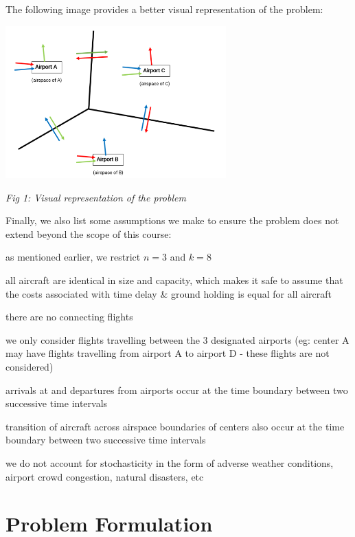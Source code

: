 \documentclass[conference]{IEEEtran}
\begin{document}
The following image provides a better visual representation of the problem:
\begin{center}
    \centerline{\includegraphics[width=8.5cm]{problem_description.png}}
    \textit{Fig 1: Visual representation of the problem}
\end{center}

Finally, we also list some assumptions we make to ensure the problem does not extend beyond the scope of this course:
\begin{enumerate}[label={[\arabic*]}]
    \item as mentioned earlier, we restrict $n=3$ and $k=8$
    \item all aircraft are identical in size and capacity, which makes it safe to assume that the costs associated with time delay \& ground holding is equal for all aircraft
    \item there are no connecting flights
    \item we only consider flights travelling between the 3 designated airports (eg: center A may have flights travelling from airport A to airport D - these flights are not considered)
    \item arrivals at and departures from airports occur at the time boundary between two successive time intervals
    \item transition of aircraft across airspace boundaries of centers also occur at the time boundary between two successive time intervals
    \item we do not account for stochasticity in the form of adverse weather conditions, airport crowd congestion, natural disasters, etc
\end{enumerate}

\section{\large Problem Formulation}
\label{sec:sec3}
\vspace{1mm}
\end{document}
